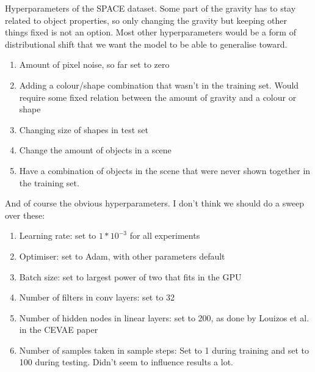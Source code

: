 \documentclass{article}
\begin{document}
\noindent
Hyperparameters of the SPACE dataset. Some part of the gravity has to stay related to object properties, so only changing the gravity but keeping other things fixed is not an option. Most other hyperparameters would be a form of distributional shift that we want the model to be able to generalise toward.
\begin{enumerate}
    \item Amount of pixel noise, so far set to zero
    \item Adding a colour/shape combination that wasn't in the training set. Would require some fixed relation between the amount of gravity and a colour or shape
    \item Changing size of shapes in test set
    \item Change the amount of objects in a scene
    \item Have a combination of objects in the scene that were never shown together in the training set.
\end{enumerate}

\noindent
And of course the obvious hyperparameters. I don't think we should do a sweep over these:
\begin{enumerate}
    \item Learning rate: set to $1*10^{-3}$ for all experiments
    \item Optimiser: set to Adam, with other parameters default
    \item Batch size: set to largest power of two that fits in the GPU
    \item Number of filters in conv layers: set to 32
    \item Number of hidden nodes in linear layers: set to 200, as done by Louizos et al. in the CEVAE paper
    \item Number of samples taken in sample steps: Set to 1 during training and set to 100 during testing. Didn't seem to influence results a lot.
\end{enumerate}
\end{document}
